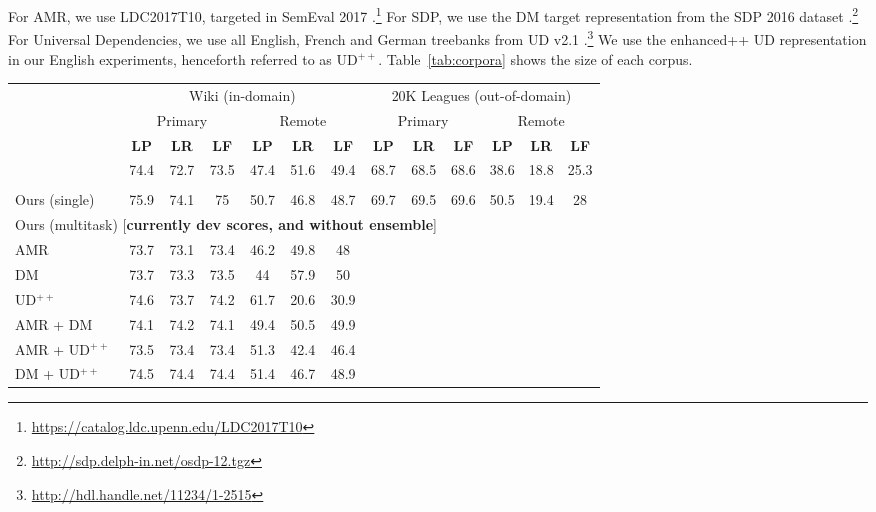 \documentclass[11pt,a4paper]{article}
\begin{document}
For AMR, we use LDC2017T10, targeted in SemEval 2017
\cite{may2017semeval}.\footnote{\url{https://catalog.ldc.upenn.edu/LDC2017T10}}
For SDP, we use the DM target representation from the SDP 2016 dataset
\cite{oepen2016towards}.\footnote{\url{http://sdp.delph-in.net/osdp-12.tgz}}
For Universal Dependencies, we use all English, French and German treebanks from UD v2.1
\cite{11234/1-2515}.\footnote{\url{http://hdl.handle.net/11234/1-2515}}
We use the enhanced++ UD representation \cite{SCHUSTER16.779} in our English experiments,
henceforth referred to as UD$^{++}$.
Table~\ref{tab:corpora} shows the size of each corpus.


\begin{table*}
\centering
	\begin{tabular}{l|ccc|ccc||ccc|ccc}
		& \multicolumn{6}{c||}{\footnotesize Wiki (in-domain)}
		& \multicolumn{6}{c}{\footnotesize 20K Leagues (out-of-domain)} \\
		& \multicolumn{3}{c|}{\footnotesize Primary} & \multicolumn{3}{c||}{\footnotesize Remote}
		& \multicolumn{3}{c|}{\footnotesize Primary} & \multicolumn{3}{c}{\footnotesize Remote} \\
		& \footnotesize \textbf{LP} & \footnotesize \textbf{LR} & \footnotesize \textbf{LF}
		& \footnotesize \textbf{LP} & \footnotesize \textbf{LR} & \footnotesize \textbf{LF}
		& \footnotesize \textbf{LP} & \footnotesize \textbf{LR} & \footnotesize \textbf{LF}
		& \footnotesize \textbf{LP} & \footnotesize \textbf{LR} & \footnotesize \textbf{LF} \\
		\hline
		\multirow{2}{2cm}{\citet{hershcovich2017a}}
		& 74.4 & 72.7 & 73.5 & 47.4 & 51.6 & 49.4
		& 68.7 & 68.5 & 68.6 & 38.6 & 18.8 & 25.3 \\
		&&&&&&&&&&&& \\
		Ours (single)
		& 75.9 & 74.1 & 75 & 50.7 & 46.8 & 48.7 
		& 69.7 & 69.5 & 69.6 & 50.5 & 19.4 & 28 \\
		\hline
		\multicolumn{9}{l}{\small Ours (multitask) [{\bf currently dev scores, and without ensemble}]} \\
		AMR & 73.7 & 73.1 & 73.4 & 46.2 & 49.8 & 48 \\
		DM & 73.7 & 73.3 & 73.5 & 44 & 57.9 & 50 \\
		UD$^{++}$ & 74.6 & 73.7 & 74.2 & 61.7 & 20.6 & 30.9 \\
		AMR + DM & 74.1 & 74.2 & 74.1 & 49.4 & 50.5 & 49.9 \\
		AMR + UD$^{++}$ & 73.5 & 73.4 & 73.4 & 51.3 & 42.4 & 46.4 \\
		DM + UD$^{++}$ & 74.5 & 74.4 & 74.4 & 51.4 & 46.7 & 48.9 \\

\end{tabular}
\end{table*}
\end{document}
